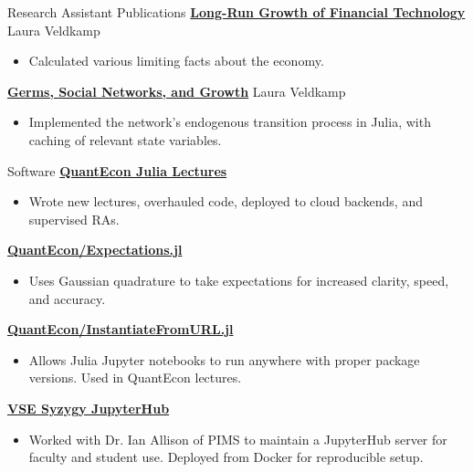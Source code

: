 \documentclass{resume} %
\begin{document}
\begin{rSection}{Research Assistant Publications}
    {\bf \href{https://www.aeaweb.org/articles?id=10.1257/aer.20171349}{Long-Run Growth of Financial Technology}} \hfill {Laura Veldkamp}
    \begin{itemize}
        \item Calculated various limiting facts about the economy.
    \end{itemize}

    {\bf \href{http://www.restud.com/wp-content/uploads/2019/11/MS19864manuscript.pdf}{Germs, Social Networks, and Growth}} \hfill {Laura Veldkamp}
    \begin{itemize}
        \item Implemented the network's endogenous transition process in Julia, with caching of relevant state variables.
    \end{itemize}
\end{rSection}

\begin{rSection}{Software}
    {\bf \href{https://julia.quantecon.org}{QuantEcon Julia Lectures}} %
    \begin{itemize}
        \item Wrote new lectures, overhauled code, deployed to cloud backends, and supervised RAs.
    \end{itemize}

    {\bf \href{https://github.com/quantecon/Expectations.jl}{QuantEcon/Expectations.jl}} %
    \begin{itemize}
        \item Uses Gaussian quadrature to take expectations for increased clarity, speed, and accuracy. 
    \end{itemize}

    {\bf \href{https://github.com/quantecon/InstantiateFromURL.jl}{QuantEcon/InstantiateFromURL.jl}} %
    \begin{itemize}
        \item Allows Julia Jupyter notebooks to run anywhere with proper package versions. Used in QuantEcon lectures.
    \end{itemize}

    {\bf \href{https://vse.syzygy.ca}{VSE Syzygy JupyterHub}} %
    \begin{itemize}
        \item Worked with Dr. Ian Allison of PIMS to maintain a JupyterHub server for faculty and student use. Deployed from Docker for reproducible setup.
    \end{itemize}
\end{rSection}
\end{document}
